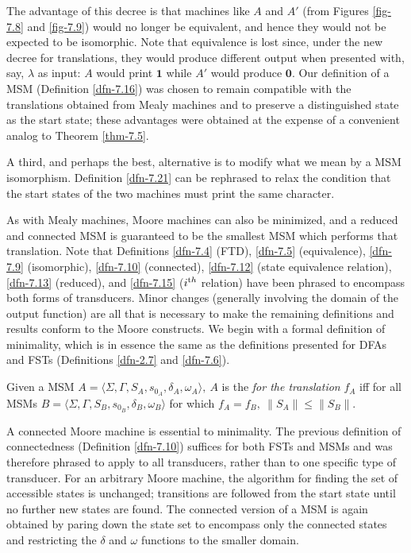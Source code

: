 The advantage of this decree is that machines like $A$ and $A'$ (from Figures
\ref{fig-7.8} and \ref{fig-7.9}) would no longer be equivalent, and hence they would not be expected
to be isomorphic. Note that equivalence is lost since, under the new decree for
translations, they would produce different output when presented with, say,
$\lambda$ as input: $A$ would print $\pmb{1}$ while $A'$ would produce
$\pmb{0}$. Our definition of a MSM (Definition \ref{dfn-7.16}) was chosen to remain
compatible with the translations obtained from Mealy machines and to preserve a
distinguished state as the start state; these advantages were obtained at the
expense of a convenient analog to Theorem \ref{thm-7.5}.

A third, and perhaps the best, alternative is to modify what we mean by a MSM
isomorphism. Definition \ref{dfn-7.21} can be rephrased to relax the condition that the
start states of the two machines must print the same character.

As with Mealy machines, Moore machines can also be minimized, and a reduced and
connected MSM is guaranteed to be the smallest MSM which performs that
translation. Note that Definitions \ref{dfn-7.4} (FTD), \ref{dfn-7.5} (equivalence), \ref{dfn-7.9}
(isomorphic), \ref{dfn-7.10} (connected), \ref{dfn-7.12} (state equivalence relation), \ref{dfn-7.13}
(reduced), and \ref{dfn-7.15} ($i^{\text th}$ relation) have been phrased to encompass both forms
of transducers. Minor changes (generally involving the domain of the output
function) are all that is necessary to make the remaining definitions and
results conform to the Moore constructs. We begin with a formal definition of
minimality, which is in essence the same as the definitions presented for DFAs
and FSTs (Definitions \ref{dfn-2.7} and \ref{dfn-7.6}).

\begin{dfn}\label{dfn-7.23}
Given a MSM $A=\langle\Sigma,\Gamma,S_A,s_{0_A},\delta_A,\omega_A\rangle,\ A$ is
the \emph{ for the translation} $f_A$ iff for all MSMs
$B=\langle\Sigma,\Gamma,S_B,s_{0_B},\delta_B,\omega_B\rangle$ for which
$f_A = f_B,\ \|S_A\| \leq \|S_B\|$.
\end{dfn}

A connected Moore machine is essential to minimality. The previous definition
of connectedness (Definition \ref{dfn-7.10}) suffices for both FSTs and MSMs and was
therefore phrased to apply to all transducers, rather than to one specific
type of transducer. For an arbitrary Moore machine, the algorithm for finding
the set of accessible states is unchanged; transitions are followed from the
start state until no further new states are found. The connected version of a
MSM is again obtained by paring down the state set to encompass only the
connected states and restricting the $\delta$ and $\omega$ functions to the
smaller domain.


